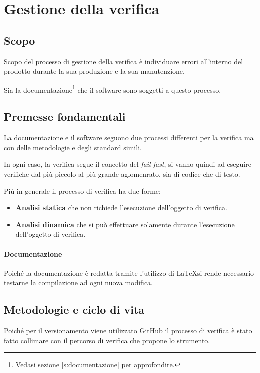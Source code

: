 \section{Gestione della verifica}\label{s:verifica}
\subsection{Scopo}

Scopo del processo di gestione della verifica è individuare errori all'interno del prodotto durante la sua produzione e la sua manutenzione.

Sia la documentazione\footnote{Vedasi sezione \ref{s:documentazione} per approfondire.} che il software sono soggetti a questo processo.

\subsection{Premesse fondamentali}

La documentazione e il software seguono due processi differenti per la verifica ma con delle metodologie e degli standard simili.

In ogni caso, la verifica segue il concetto del \textit{fail fast}, si vanno quindi ad eseguire verifiche dal più piccolo al più grande aglomenrato, sia di codice che di testo.

Più in generale il processo di verifica ha due forme:
\begin{itemize}
    \item \textbf{Analisi statica} che non richiede l'esecuzione dell'oggetto di verifica.
    \item \textbf{Analisi dinamica} che si può effettuare solamente durante l'esecuzione dell'oggetto di verifica.
\end{itemize}

\paragraph{Documentazione} Poiché la documentazione è redatta tramite l'utilizzo di \LaTeX si rende necessario testarne la compilazione ad ogni nuova modifica.

\subsection{Metodologie e ciclo di vita}

Poiché per il versionamento viene utilizzato GitHub il processo di verifica è stato fatto collimare con il percorso di verifica che propone lo strumento.

